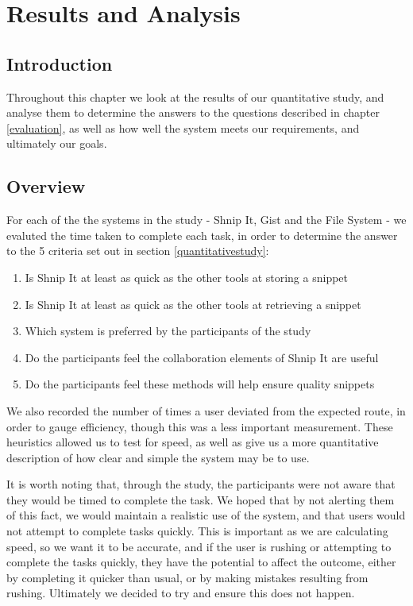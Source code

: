 \chapter{Results and Analysis}

\section{Introduction}
Throughout this chapter we look at the results of our quantitative study, and analyse them to determine the answers to the questions described in chapter \ref{evaluation}, as well as how well the system meets our requirements, and ultimately our goals. 

\section{Overview}
For each of the the systems in the study - Shnip It, Gist and the File System - we evaluted the time taken to complete each task, in order to determine the answer to the 5 criteria set out in section \ref{quantitativestudy}:
\begin{enumerate}
\item Is Shnip It at least as quick as the other tools at storing a snippet
\item Is Shnip It at least as quick as the other tools at retrieving a snippet
\item Which system is preferred by the participants of the study
\item Do the participants feel the collaboration elements of Shnip It are useful
\item Do the participants feel these methods will help ensure quality snippets
\end{enumerate}

We also recorded the number of times a user deviated from the expected route, in order to gauge efficiency, though this was a less important measurement.
These heuristics allowed us to test for speed, as well as give us a more quantitative description of how clear and simple the system may be to use.

It is worth noting that, through the study, the participants were not aware that they would be timed to complete the task.
We hoped that by not alerting them of this fact, we would maintain a realistic use of the system, and that users would not attempt to complete tasks quickly.
This is important as we are calculating speed, so we want it to be accurate, and if the user is rushing or attempting to complete the tasks quickly, they have the potential to affect the outcome, either by completing it quicker than usual, or by making mistakes resulting from rushing.
Ultimately we decided to try and ensure this does not happen.

